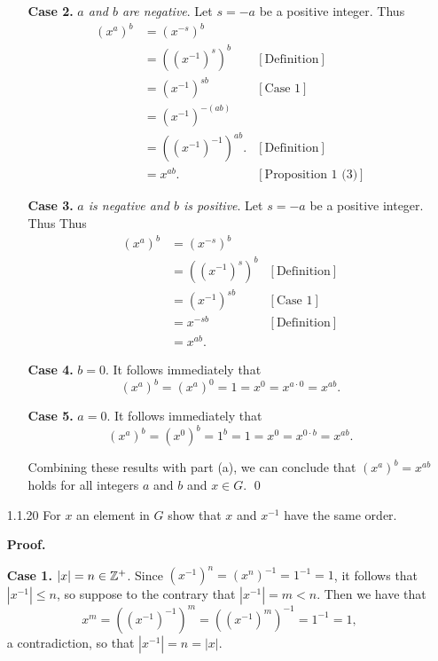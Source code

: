 \begin{enumerate}
\begin{enumerate}
               \textbf{Case 2.} \textit{$a$ and $b$ are negative}. Let $s = -a$ 
               be a positive integer. Thus
               \begin{align*}
                  (x^a)^b &= (x^{-s})^b \\
                          &= ((x^{-1})^s)^b &[\text{Definition}] \\
                          &= (x^{-1})^{sb} &[\text{Case 1}] \\
                          &= (x^{-1})^{-(ab)}  \\
                          &= ((x^{-1})^{-1})^{ab}. &[\text{Definition}] \\
                          &= x^{ab}. &[\text{Proposition 1 (3)}]
               \end{align*}

               \textbf{Case 3.} \textit{$a$ is negative and $b$ is positive}. 
               Let $s = -a$ be a positive integer. Thus
               Thus
               \begin{align*}
                  (x^a)^b &= (x^{-s})^b \\
                          &= ((x^{-1})^s)^b &[\text{Definition}] \\
                          &= (x^{-1})^{sb} &[\text{Case 1}] \\
                          &= x^{-sb} &[\text{Definition}] \\
                          &= x^{ab}.
               \end{align*}               

               \textbf{Case 4.} $b = 0$. It follows immediately that
               $$(x^a)^b = (x^a)^0 = 1 = x^0 = x^{a\cdot 0} = x^{ab}.$$

               \textbf{Case 5.} $a = 0$. It follows immediately that
               $$(x^a)^b = (x^0)^b = 1^b = 1 = x^0 = x^{0\cdot b} = x^{ab}.$$

               Combining these results with part (a), we can conclude that
               $(x^a)^b = x^{ab}$ holds for all integers $a$ and $b$ and
               $x \in G$. \qed
      \end{enumerate}
   \item[1.1.20]  For $x$ an element in $G$ show that $x$ and $x^{-1}$ have the
                  same order.

      \textbf{Proof.}

      \textbf{Case 1.} \textit{$|x| = n \in \mathbb{Z}^+$}. Since
      $(x^{-1})^n = (x^n)^{-1} = 1^{-1} = 1$, it follows that $|x^{-1}| \le n$,
      so suppose to the contrary that $|x^{-1}| = m < n$. Then we have that
      $$x^m = ((x^{-1})^{-1})^m = ((x^{-1})^m)^{-1} = 1^{-1} = 1,$$
      a contradiction, so that $|x^{-1}| = n = |x|$.


\end{enumerate}
